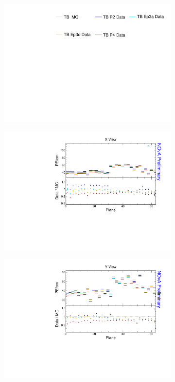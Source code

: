 \begin{figure}[!ht]
  \begin{subfigure}{\textwidth}
  \centering
    \includegraphics[height=0.2\linewidth]{essentialsec_tb/legend.pdf}
  \end{subfigure}
  \vspace*{2mm}

  \begin{subfigure}{0.5\textwidth}
    \includegraphics[width=\linewidth]{essentialsec_tb/pecm_plane_x.pdf}
  \end{subfigure}
  \begin{subfigure}{0.5\textwidth}
    \includegraphics[width=\linewidth]{essentialsec_tb/pecm_plane_y.pdf}

\end{subfigure}
\end{figure}
